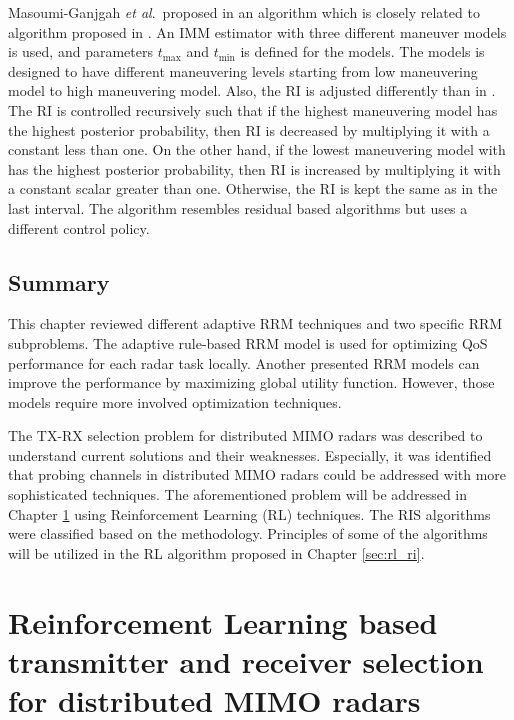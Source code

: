\documentclass[english, 12pt, a4paper, elec, utf8, a-1b, online]{aaltothesis}
\newcommand{\etal}{\textit{et al}.~}
\newcommand{\tmax}{t_\text{max}}
\newcommand{\tmin}{t_\text{min}}
\begin{document}
Masoumi-Ganjgah \etal proposed in \cite{MasoumiGanjgah2017} an algorithm which is closely related to algorithm proposed in \cite{Benoudnine2006}.
An IMM estimator with three different maneuver models is used, and parameters $\tmax$ and $\tmin$ is defined for the models.
The models is designed to have different maneuvering levels starting from low maneuvering model to high maneuvering model.
Also, the RI is adjusted differently than in \cite{Benoudnine2006}.
The RI is controlled recursively such that if the highest maneuvering model has the highest posterior probability, then 
RI is decreased by multiplying it with a constant less than one.
On the other hand, if the lowest maneuvering model with has the highest posterior probability, then
RI is increased by multiplying it with a constant scalar greater than one.
Otherwise, the RI is kept the same as in the last interval.
The algorithm resembles residual based algorithms but uses a different control policy.

\subsection{Summary}

This chapter reviewed different adaptive RRM techniques and two specific RRM subproblems.
The adaptive rule-based RRM model is used for optimizing QoS performance for each radar task locally.
Another presented RRM models can improve the performance by maximizing global utility function.
However, those models require more involved optimization techniques.

The TX-RX selection problem for distributed MIMO radars was described to understand current solutions and their weaknesses.
Especially, it was identified that probing channels in distributed MIMO radars could be addressed with more sophisticated techniques.
The aforementioned problem will be addressed in Chapter \ref{sec:RL_TX_RX} using Reinforcement Learning (RL) techniques.
The RIS algorithms were classified based on the methodology.
Principles of some of the algorithms will be utilized in the RL algorithm proposed in Chapter \ref{sec:rl_ri}. 



\newpage
\section{Reinforcement Learning based transmitter and receiver selection for distributed MIMO radars}\label{sec:RL_TX_RX}
\end{document}
